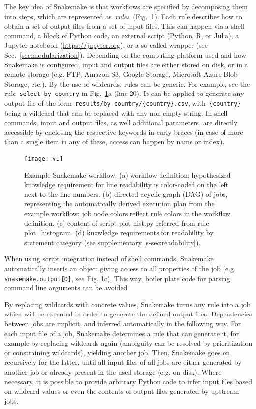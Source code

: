 \documentclass[parskip=half]{scrartcl}
\newcommand{\image}[1]{\centering\texttt{[image: \#1]}}
\let\plainurl\url
\renewcommand{\url}[1]{\protect\plainurl{#1}}
\begin{document}
The key idea of Snakemake is that workflows are specified by decomposing them into steps, which are represented as~\emph{rules~}(Fig.~\ref{fig:example}).
Each rule describes how to obtain a set of output files from a set of input files.
This can happen via a shell command, a block of Python code, an external script (Python, R, or Julia), a Jupyter notebook (\url{https://jupyter.org}), or a so-called wrapper (see Sec.~\ref{sec:modularization}).
Depending on the computing platform used and how Snakemake is configured, input and output files are either stored on disk, or in a remote storage (e.g. FTP, Amazon S3, Google Storage, Microsoft Azure Blob Storage, etc.).
By the use of wildcards, rules can be generic.
For example, see the rule~\lstinline!select_by_country! in Fig.~\ref{fig:example}a (line 20).
It can be applied to generate any output file of the form~\lstinline!results/by-country/{country}.csv!, with~\lstinline!{country}! being a wildcard that can be replaced with any non-empty string.
In shell commands, input and output files, as well additional parameters, are directly accessible by enclosing the respective keywords in curly braces (in case of more than a single item in any of these, access can happen by name or index).

\begin{figure}
	\image{example-workflow.pdf}
	\caption{
		Example Snakemake workflow. (a) workflow definition; hypothesized knowledge requirement for line readability is color-coded on the left next to the line numbers. (b) directed acyclic graph (DAG) of jobs, representing the automatically derived execution plan from the example workflow; job node colors reflect rule colors in the workflow definition. (c) content of script plot-hist.py referred from rule plot\_histogram. (d) knowledge requirements for readability by statement category (see supplementary \autoref{s-sec:readability}).
	}
	\label{fig:example}
\end{figure}

When using script integration instead of shell commands, Snakemake automatically inserts an object giving access to all properties of the job (e.g. \lstinline!snakemake.output[0]!, see Fig.
\ref{fig:example}c).
This way, boiler plate code for parsing command line arguments can be avoided.

By replacing wildcards with concrete values, Snakemake turns any rule into a job which will be executed in order to generate the defined output files.
Dependencies between jobs are implicit, and inferred automatically in the following way.
For each input file of a job, Snakemake determines a rule that can generate it, for example by replacing wildcards again (ambiguity can be resolved by prioritization or constraining wildcards), yielding another job.
Then, Snakemake goes on recursively for the latter, until all input files of all jobs are either generated by another job or already present in the used storage (e.g. on disk).
Where necessary, it is possible to provide arbitrary Python code to infer input files based on wildcard values or even the contents of output files generated by upstream jobs.
\end{document}
